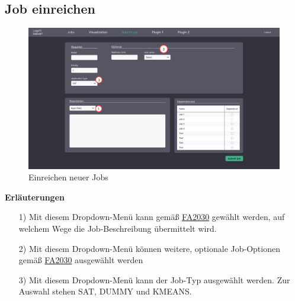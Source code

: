 \subsection{Job einreichen}
\label{pages:submit-job}
\begin{figure}[H]
    \centering
    \includegraphics[width=\textwidth]{images-interface/v3_interface/submit_job_page_v3.pdf}
    \caption{Einreichen neuer Jobs}
    \label{fig:submit-job}
\end{figure}
\textbf{Erläuterungen}
\begin{itemize}
    \item[1)] Mit diesem Dropdown-Menü kann gemäß \hyperref[FA:Web-Interface:Job einreichen]{FA2030} gewählt werden, auf welchem Wege die Job-Beschreibung übermittelt wird.
    \item[2)] Mit diesem Dropdown-Menü können weitere, optionale Job-Optionen gemäß \hyperref[FA:Web-Interface:Job einreichen]{FA2030} ausgewählt werden
    \item[3)] Mit diesem Dropdown-Menü kann der Job-Typ ausgewählt werden. Zur Auswahl stehen SAT, DUMMY und KMEANS.
\end{itemize}

\newpage
